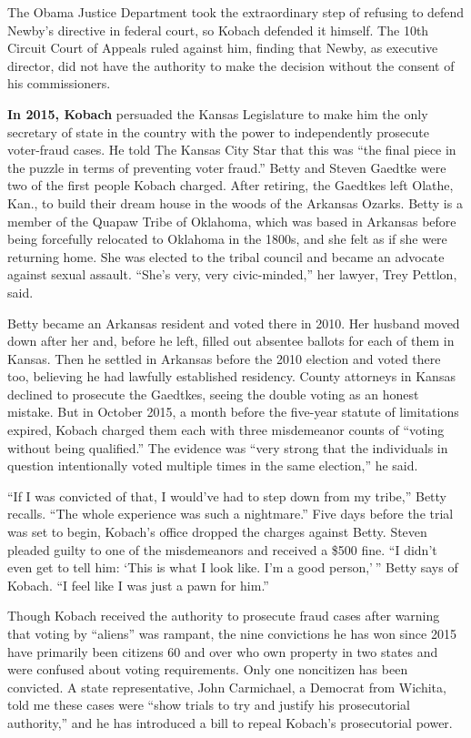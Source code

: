 The Obama Justice Department took the extraordinary step of refusing to
defend Newby's directive in federal court, so Kobach defended it
himself. The 10th Circuit Court of Appeals ruled against him, finding
that Newby, as executive director, did not have the authority to make
the decision without the consent of his commissioners.

\textbf{In 2015, Kobach} persuaded the Kansas Legislature to make him
the only secretary of state in the country with the power to
independently prosecute voter-fraud cases. He told The Kansas City Star
that this was ``the final piece in the puzzle in terms of preventing
voter fraud.'' Betty and Steven Gaedtke were two of the first people
Kobach charged. After retiring, the Gaedtkes left Olathe, Kan., to build
their dream house in the woods of the Arkansas Ozarks. Betty is a member
of the Quapaw Tribe of Oklahoma, which was based in Arkansas before
being forcefully relocated to Oklahoma in the 1800s, and she felt as if
she were returning home. She was elected to the tribal council and
became an advocate against sexual assault. ``She's very, very
civic-minded,'' her lawyer, Trey Pettlon, said.

Betty became an Arkansas resident and voted there in 2010. Her husband
moved down after her and, before he left, filled out absentee ballots
for each of them in Kansas. Then he settled in Arkansas before the 2010
election and voted there too, believing he had lawfully established
residency. County attorneys in Kansas declined to prosecute the
Gaedtkes, seeing the double voting as an honest mistake. But in October
2015, a month before the five-year statute of limitations expired,
Kobach charged them each with three misdemeanor counts of ``voting
without being qualified.'' The evidence was ``very strong that the
individuals in question intentionally voted multiple times in the same
election,'' he said.

``If I was convicted of that, I would've had to step down from my
tribe,'' Betty recalls. ``The whole experience was such a nightmare.''
Five days before the trial was set to begin, Kobach's office dropped the
charges against Betty. Steven pleaded guilty to one of the misdemeanors
and received a \$500 fine. ``I didn't even get to tell him: `This is
what I look like. I'm a good person,' '' Betty says of Kobach. ``I feel
like I was just a pawn for him.''

Though Kobach received the authority to prosecute fraud cases after
warning that voting by ``aliens'' was rampant, the nine convictions he
has won since 2015 have primarily been citizens 60 and over who own
property in two states and were confused about voting requirements. Only
one noncitizen has been convicted. A state representative, John
Carmichael, a Democrat from Wichita, told me these cases were ``show
trials to try and justify his prosecutorial authority,'' and he has
introduced a bill to repeal Kobach's prosecutorial power.

